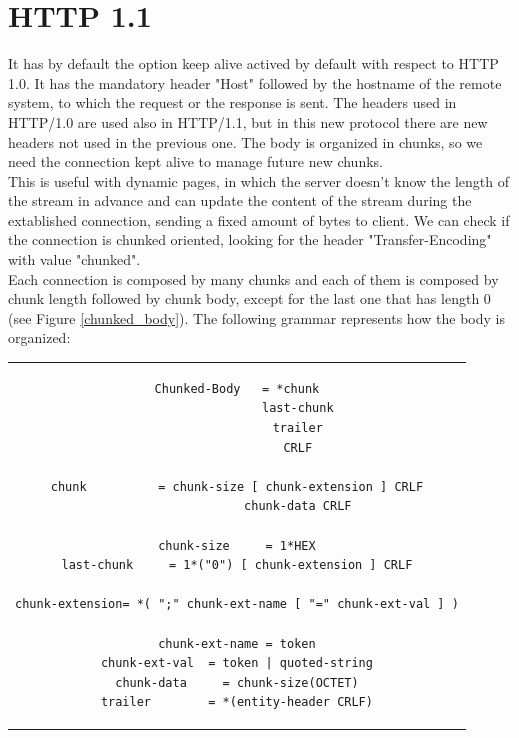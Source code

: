 \section{HTTP 1.1}
It has by default the option keep alive actived by default with respect to HTTP 1.0. It has the mandatory header "Host" followed by the hostname of the remote system, to which the request or the response is sent. The headers used in HTTP/1.0 are used also in HTTP/1.1, but in this new protocol there are new headers not used in the previous one. The body is organized in chunks, so we need the connection kept alive to manage future new chunks.\\
This is useful with dynamic pages, in which the server doesn't know the length of the stream in advance and can update the content of the stream during the extablished connection, sending a fixed amount of bytes to client. We can check if the connection is chunked oriented, looking for the header "Transfer-Encoding" with value "chunked".\\
Each connection is composed by many chunks and each of them is composed by chunk length followed by chunk body, except for the last one that has length 0 (see Figure \ref{chunked_body}). The following grammar represents how the body is organized:
\begin{center}
\begin{tabular}{c}
\begin{lstlisting}[linewidth=320pt, basicstyle=\footnotesize\sffamily,]
Chunked-Body   = *chunk
                 last-chunk
                 trailer
                 CRLF

chunk          = chunk-size [ chunk-extension ] CRLF
                 chunk-data CRLF

chunk-size     = 1*HEX
last-chunk     = 1*("0") [ chunk-extension ] CRLF

chunk-extension= *( ";" chunk-ext-name [ "=" chunk-ext-val ] )

chunk-ext-name = token
chunk-ext-val  = token | quoted-string
chunk-data     = chunk-size(OCTET)
trailer        = *(entity-header CRLF)
\end{lstlisting}
\end{tabular}
\end{center}

